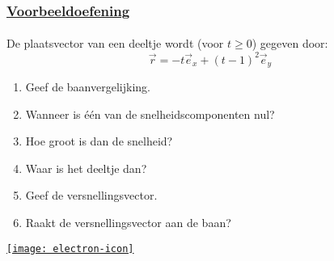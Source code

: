 \begin{frame}
	\frametitle{\href{https://www.geogebra.org/m/wvteqkrr}{Voorbeeldoefening}}
	\framesubtitle{}
	
	De plaatsvector van een deeltje wordt (voor $t\geq0$) gegeven door:
\begin{equation*}
	\vec{r}=-t\vec{e}_x+(t-1)^2\vec{e}_y
\end{equation*}

\begin{enumerate}

\item Geef de baanvergelijking.
\item Wanneer is \'e\'en van de snelheidscomponenten nul?
\item Hoe groot is dan de snelheid?
\item Waar is het deeltje dan?
\item Geef de versnellingsvector.
\item Raakt de versnellingsvector aan de baan? %

\end{enumerate}
	\hfill\href{run:./app/vb_2D.ggb}{\texttt{[image: electron-icon]}}
\end{frame}





